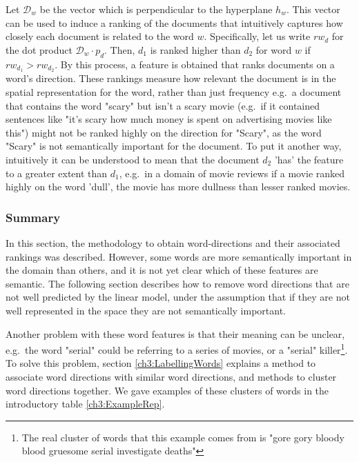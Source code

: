 Let $\mathcal{D}_w$ be the vector which is perpendicular to the hyperplane $h_w$. This vector can be used to induce a ranking of the documents that intuitively captures how closely each document is related to the word $w$. Specifically, let us write $rw_d$ for the dot product $\mathcal{D}_w\cdot p_d$.  Then, $d_1$ is ranked higher than $d_2$ for word $w$ if $rw_{d_1} > rw_{d_2}$. By this process, a feature is obtained that ranks documents on a word's direction. These rankings measure how relevant the document is in the spatial representation for the word, rather than just frequency e.g.\  a document that contains the word "scary" but isn't a scary movie (e.g.\ if it contained sentences like "it's scary how much money is spent on advertising movies like this") might not be ranked highly on the direction for "Scary", as the word "Scary" is not semantically important for the document. To put it another way, intuitively it can be understood to mean that the document $d_2$ 'has' the feature  to a greater extent than $d_1$, e.g.\ in a domain of movie reviews if a movie ranked highly on the word 'dull', the movie has more dullness than lesser ranked movies. %

\subsubsection{Summary}

In this section, the methodology to obtain word-directions and their associated rankings was described. However, some words are more semantically important in the domain than others, and it is not yet clear which of these features are semantic. The following section describes how to remove word directions that are not well predicted by the linear model, under the assumption that if they are not well represented in the space they are not semantically important. 

Another problem with these word features  is that their meaning can be unclear, e.g.\ the word "serial" could be referring to a series of movies, or a "serial" killer\footnote{The real cluster of words that this example comes from is "gore gory bloody blood gruesome serial investigate deaths"}. To solve this problem, section \ref{ch3:LabellingWords} explains a method to associate word directions with similar word directions, and methods to cluster word directions together. We gave examples of these clusters of words in the introductory table \ref{ch3:ExampleRep}. %






